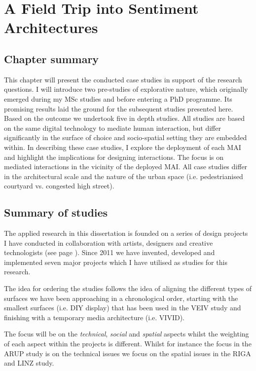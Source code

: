 \chapter{A Field Trip into Sentiment Architectures}
\label{chapterlabel6}

\section*{Chapter summary}

This chapter will present the conducted case studies in support of the research questions. I will introduce two pre-studies of explorative nature, which originally emerged during my MSc studies and before entering a PhD programme. Its promising results laid the ground for the subsequent studies presented here. Based on the outcome we undertook five in depth studies.  All studies are based on the same digital technology to mediate human interaction, but differ significantly in the surface of choice and socio-spatial setting they are embedded within. In describing these case studies, I explore the deployment of each MAI and highlight the implications for designing interactions. The focus is on mediated interactions in the vicinity of the deployed MAI. All case studies differ in the architectural scale and the nature of the urban space (i.e. pedestrianised courtyard vs. congested high street). \newpage



\section{Summary of studies}

The applied research in this dissertation is founded on a series of design projects I have conducted in collaboration with artists, designers and creative technologists (see page \pageref{sec:projects}).
Since 2011 we have invented, developed and implemented seven major projects which I have utilised as studies for this research.

The idea for ordering the studies follows the idea of aligning the different types of surfaces we have been approaching in a chronological order, starting with the smallest surfaces (i.e. DIY display) that has been used in the VEIV study and finishing with a temporary media architecture (i.e. VIVID). 

The focus will be on the \textit{technical}, \textit{social} and \textit{spatial} aspects whilst the weighting of each aspect within the projects is different. Whilst for instance the focus in the ARUP study is on the technical issues we focus on the spatial issues in the RIGA and LINZ study.

